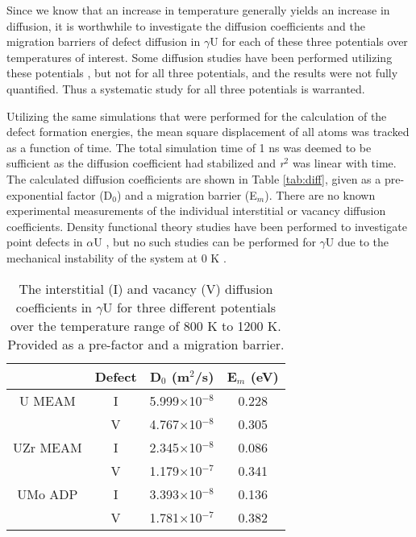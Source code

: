 \documentclass[review]{elsarticle}
\begin{document}
\FloatBarrier

Since we know that an increase in temperature generally yields an increase in diffusion, it is worthwhile to investigate the diffusion coefficients and the migration barriers of defect diffusion in $\gamma$U for each of these three potentials over temperatures of interest. Some diffusion studies have been performed utilizing these potentials \cite{smirnovaADP, smirnova2015}, but not for all three potentials, and the results were not fully quantified. Thus a systematic study for all three potentials is warranted.

Utilizing the same simulations that were performed for the calculation of the defect formation energies, the mean square displacement of all atoms was tracked as a function of time. The total simulation time of 1 ns was deemed to be sufficient as the diffusion coefficient had stabilized and \textit{r}$^{2}$ was linear with time. The calculated diffusion coefficients are shown in Table \ref{tab:diff}, given as a pre-exponential factor (D$_{0}$) and a migration barrier (E$_{m}$). There are no known experimental measurements of the individual interstitial or vacancy diffusion coefficients. Density functional theory studies have been performed to investigate point defects in $\alpha$U \cite{wirth2011}, but no such studies can be performed for $\gamma$U due to the mechanical instability of the system at 0 K \cite{beeler2010}.

\begin{table}[h]
\caption{The interstitial (I) and vacancy (V) diffusion coefficients in $\gamma$U for three different potentials over the temperature range of 800 K to 1200 K. Provided as a pre-factor and a migration barrier.} \label{tab:diff}
\begin{center}
\begin{tabular}{|c|c|c|c|}
	\hline
	& Defect & D$_{0}$ (m$^{2}$/s) & E$_{m}$ (eV)\\
	 \hline
	U MEAM & I & 5.999$\times$10$^{-8}$ & 0.228 \\
			& V & 4.767$\times$10$^{-8}$ & 0.305 \\
			\hline
	UZr MEAM & I & 2.345$\times$10$^{-8}$ & 0.086 \\
			& V & 1.179$\times$10$^{-7}$ & 0.341 \\
			\hline
	UMo ADP & I & 3.393$\times$10$^{-8}$ & 0.136 \\
			& V & 1.781$\times$10$^{-7}$ & 0.382 \\
	\hline
\end{tabular}
\end{center}
\label{default}
\end{table}
\end{document}
